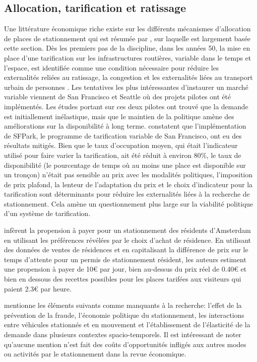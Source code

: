   \subsection{Allocation, tarification et ratissage}
    Une littérature économique riche existe sur les différents mécanismes d'allocation de places de stationnement qui est résumée par \textcite{Inci:ReviewEconomics:2015}, sur laquelle est largement basée cette section. Dès les premiers pas de la discipline, dans les années 50, la mise en place d'une tarification sur les infrastructures routières, variable dans le temps et l'espace, est identifiée comme une condition nécessaire pour réduire les externalités reliées au ratissage, la congestion et les externalités liées au transport urbain de personnes \parencite{Vickrey:StatementJoint:1994}. Les tentatives les plus intéressantes d'instaurer un marché variable viennent de San Francisco et Seattle où des projets pilotes ont été implémentés. Les études portant sur ces deux pilotes ont trouvé que la demande est initiallement inélastique, mais que le maintien de la politique amène des améliorations sur la disponibilité à long terme. \textcite{Chatman:TheoryImplementation:2014} constatent que l'implémentation de SFPark, le programme de tarification variable de San Francisco, ont eu des résultats mitigés. Bien que le taux d'occupation moyen, qui était l'indicateur utilisé pour faire varier la tarification,  ait été réduit à environ 80\%, le taux de disponibilité (le pourcentage de temps où au moins une place est disponible sur un tronçon) n'était pas sensible au prix avec les modalités politiques, l'imposition de prix plafond, la lenteur de l'adaptation du prix et le choix d'indicateur pour la tarification sont déterminants pour réduire les externalités liées à la recherche de stationnement. Cela amène un questionnement plus large sur la viabilité politique d'un système de tarification.\par
    \textcite{vanOmmeren:RealPrice:2011} infèrent la propension à payer pour un stationnement des résidents d'Amsterdam en utilisant les préférences révélées par le choix d'achat de résidence. En utilisant des données de ventes de résidences et en capitalisant la différence de prix sur le temps d'attente pour un permis de stationnement résident, les auteurs estiment une propension à payer de 10€ par jour, bien au-dessus du prix réel de 0.40€ et bien en dessous des recettes possibles pour les places tarifées aux visiteurs qui paient 2.3€ par heure.\par
    \textcite{Inci:ReviewEconomics:2015} mentionne les éléments suivants comme manquants à la recherche: l'effet de la prévention de la fraude, l'économie politique du stationnement, les interactions entre véhicules stationnés et en mouvement et l'établissement de l'élasticité de la demande dans plusieurs contextes spacio-temporels. Il est intéressant de noter qu'aucune mention n'est fait des coûts d'opportunités infligés aux autres modes ou activités par le stationnement dans la revue économique.

